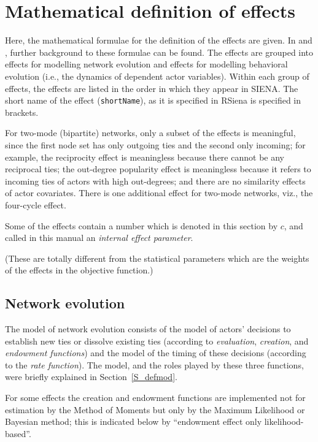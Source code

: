 \documentclass[a4paper,fleqn,11pt]{article}
\newcommand{\+}{\, + \,}
\newcommand{\RS}{{\sf RSiena }}
\newcommand{\si}{{\sf SIENA}}
\begin{document}
\newpage
\section[Formulas for effects]{Mathematical definition of effects}
\label{S_math}


Here, the mathematical formulae for the definition of the effects
are given. In \citet{Snijders01,Snijders05} and \citet*{SteglichEA10},
further background to these formulae can be found.
The effects are grouped into effects for modelling network
evolution and effects for modelling behavioral evolution (i.e.,
the dynamics of dependent actor variables). Within each group of
effects, the effects are listed in the order in which they appear
in \si. The short name of the effect (\texttt{shortName}),
as it is specified in \RS is specified in brackets.


For two-mode (bipartite) networks, only a subset of the effects is
meaningful, since the first node set has only outgoing ties
and the second only incoming; for example, the reciprocity effect
is meaningless because there cannot be any reciprocal ties;
the out-degree popularity effect is meaningless because it refers to
incoming ties of actors with high out-degrees; and there are no similarity
effects of actor covariates.
There is one additional effect for two-mode networks, viz.,
the four-cycle effect.

\hypertarget{T_effpar}{
Some of the effects contain a number which is denoted in this section
by $c$, and called in this manual an \emph{internal effect parameter}.
}
(These are totally different from the statistical parameters which are
the weights of the effects in the objective function.)

\subsection{Network evolution}
The model of network evolution consists of the model of actors'
decisions to establish new ties or dissolve existing ties
(according to {\it evaluation}, {\it creation},
and {\it endowment functions}) and the
model of the timing of these decisions (according to the {\it rate
function}).
The model, and the roles played by these three functions,
were briefly explained in Section~\ref{S_defmod}.

For some effects
the creation and endowment functions are
implemented not for estimation by the Method of Moments
but only by the Maximum Likelihood or Bayesian method;
this is indicated below by ``endowment effect only likelihood-based''.
\end{document}
